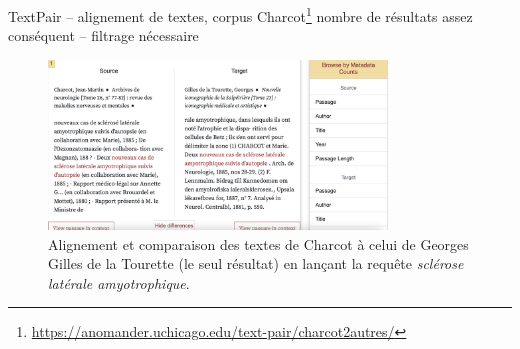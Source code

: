 \begin{frame}{TextPair -- alignement de textes, corpus Charcot\footnote{\url{https://anomander.uchicago.edu/text-pair/charcot2autres/}}}
\danger nombre de
résultats assez conséquent -- filtrage nécessaire
    \begin{figure}[!ht]
        \centering
        \includegraphics[width=90mm,scale=0.5]{pic/textpair.png}
        \caption{Alignement et comparaison des textes de
Charcot à celui de Georges Gilles de la Tourette (le seul
résultat) en lançant la requête \textit{sclérose latérale
amyotrophique}.}
        \label{fig:enter-label}
    \end{figure}
\end{frame}



